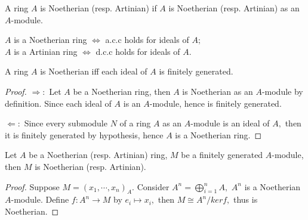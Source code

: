 \begin{Def}
A ring $A$ is Noetherian (resp. Artinian) if $A$ is Noetherian
(resp. Artinian) as an $A$-module.
\end{Def}
\begin{remark}
$A$ is a Noetherian ring $\Longleftrightarrow$ a.c.c holds for
ideals of $A;$\\
$A$ is a Artinian ring $\Longleftrightarrow$ d.c.c holds for ideals
of $A.$
\end{remark}
\begin{prop}
A ring $A$ is Noetherian iff each ideal of $A$ is finitely
generated.
\end{prop}
\begin{proof}
$\Longrightarrow:$ Let $A$ be a Noetherian ring, then $A$ is
Noetherian as an $A$-module by definition. Since each ideal of $A$
is an $A$-module, hence is finitely generated.

$\Longleftarrow:$ Since every submodule $N$ of a ring $A$ as an
$A$-module is an ideal of $A,$ then it is finitely generated by
hypothesis, hence $A$ is a Noetherian ring.
\end{proof}
\begin{prop}
Let $A$ be a Noetherian (resp. Artinian) ring, $M$ be a finitely
generated $A$-module, then $M$ is Noetherian (resp. Artinian).
\end{prop}
\begin{proof}
Suppose $M=(x_1,\cdots,x_n)_A.$ Consider
$A^n=\bigoplus\limits_{i=1}^nA,$ $A^n$ is a Noetherian $A$-module.
Define $f: A^n\rightarrow M$ by $e_i\mapsto x_i,$ then $M\cong
A^n/kerf,$ thus is Noetherian.
\end{proof}
